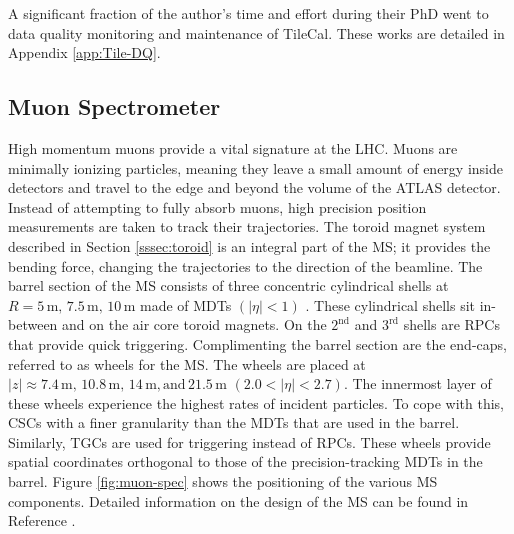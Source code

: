 			A significant fraction of the author's time and effort during their PhD went to data quality monitoring and maintenance of \gls{TileCal}. These works are detailed in Appendix \ref{app:Tile-DQ}.

	\subsection{Muon Spectrometer}\label{ssec:muon-system}
		High momentum muons provide a vital signature at the LHC. Muons are minimally ionizing particles, meaning they leave a small amount of energy inside detectors and travel to the edge and beyond the volume of the \gls{ATLAS} detector. Instead of attempting to fully absorb muons, high precision position measurements are taken to track their trajectories. The toroid magnet system described in Section \ref{sssec:toroid} is an integral part of the \gls{MS}; it provides the bending force, changing the trajectories to the direction of the beamline. The barrel section of the \gls{MS} consists of three concentric cylindrical shells at $R=5 \, \mathrm{ m, }\, 7.5 \, \mathrm{ m, } \,  10 \, \mathrm{ m}$ made of \glspl{MDT} $(|\eta|<1)$ \cite{ATLAS-muon}. These cylindrical shells sit in-between and on the air core toroid magnets. On the $2^{\mathrm{nd}}$ and $3^{\mathrm{rd}}$ shells are \glspl{RPC} that provide quick triggering. Complimenting the barrel section are the end-caps, referred to as wheels for the \gls{MS}. The wheels are placed at $|z|\approx 7.4 \, \mathrm{ m, } \, 10.8 \, \mathrm{ m, } \, 14 \, \mathrm{ m, and} \,21.5 \,\mathrm{ m }$ $(2.0 < |\eta| < 2.7)$. The innermost layer of these wheels experience the highest rates of incident particles. To cope with this, \glspl{CSC} with a finer granularity than the \glspl{MDT} that are used in the barrel. Similarly, \glspl{TGC} are used for triggering instead of \glspl{RPC}. These wheels provide spatial coordinates orthogonal to those of the precision-tracking \glspl{MDT} in the barrel. Figure \ref{fig:muon-spec} shows the positioning of the various \gls{MS} components. Detailed information on the design of the \gls{MS} can be found in Reference \cite{ATLAS-muon}.


